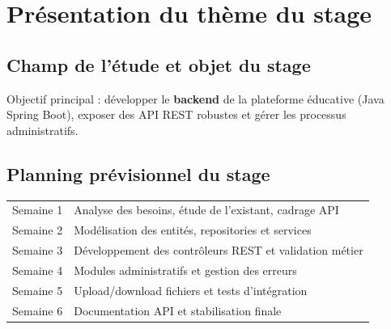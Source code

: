 \chapter{Présentation du thème du stage}

\section{Champ de l'étude et objet du stage}
Objectif principal : développer le \textbf{backend} de la plateforme éducative (Java Spring Boot), exposer des API REST robustes et gérer les processus administratifs.

\section{Planning prévisionnel du stage}
\begin{longtable}{p{}p{}}
\toprule
Semaine 1 & Analyse des besoins, étude de l'existant, cadrage API \\
Semaine 2 & Modélisation des entités, repositories et services \\
Semaine 3 & Développement des contrôleurs REST et validation métier \\
Semaine 4 & Modules administratifs et gestion des erreurs \\
Semaine 5 & Upload/download fichiers et tests d'intégration \\
Semaine 6 & Documentation API et stabilisation finale \\
\bottomrule
\end{longtable}
